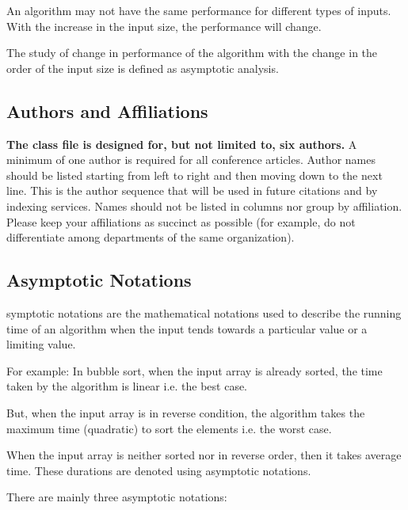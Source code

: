 \documentclass[conference]{IEEEtran}
\begin{document}
An algorithm may not have the same performance for different types of inputs. With the increase in the input size, the performance will change.

The study of change in performance of the algorithm with the change in the order of the input size is defined as asymptotic analysis.

\subsection{Authors and Affiliations}
\textbf{The class file is designed for, but not limited to, six authors.} A 
minimum of one author is required for all conference articles. Author names 
should be listed starting from left to right and then moving down to the 
next line. This is the author sequence that will be used in future citations 
and by indexing services. Names should not be listed in columns nor group by 
affiliation. Please keep your affiliations as succinct as possible (for 
example, do not differentiate among departments of the same organization).

\subsection{Asymptotic Notations}
symptotic notations are the mathematical notations used to describe the running time of an algorithm when the input tends towards a particular value or a limiting value.

For example: In bubble sort, when the input array is already sorted, the time taken by the algorithm is linear i.e. the best case.

But, when the input array is in reverse condition, the algorithm takes the maximum time (quadratic) to sort the elements i.e. the worst case.

When the input array is neither sorted nor in reverse order, then it takes average time. These durations are denoted using asymptotic notations.

There are mainly three asymptotic notations:
\end{document}
